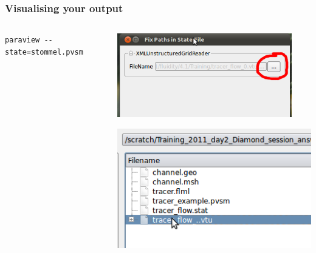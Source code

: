 \documentclass[12pt]{beamer}
\begin{document}
\begin{frame}
	\frametitle{Visualising your output}
\begin{columns}
\begin{column}{0.6\textwidth}

\texttt{paraview -{}-state=stommel.pvsm}
\end{column}
\begin{column}{0.4\textwidth}
\begin{center}
\includegraphics[width=0.9\textwidth]{images/State_box.png}

\vspace{2mm}

\includegraphics[width=\textwidth]{images/State_Open.png}
\end{center}
\end{column}
\end{columns}


\end{frame}
\end{document}
